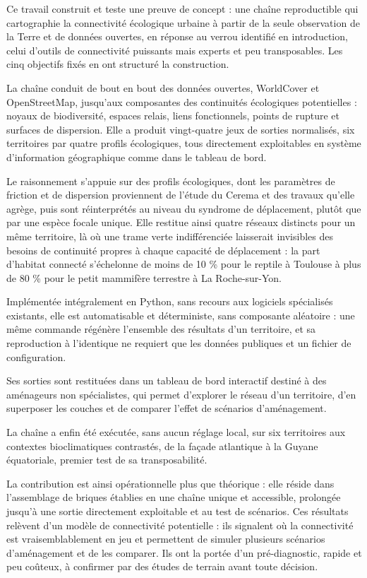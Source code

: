 \documentclass[a4paper,11pt]{report}
\begin{document}
Ce travail construit et teste une preuve de concept : une chaîne reproductible qui cartographie la connectivité écologique urbaine à partir de la seule observation de la Terre et de données ouvertes, en réponse au verrou identifié en introduction, celui d'outils de connectivité puissants mais experts et peu transposables. Les cinq objectifs fixés en ont structuré la construction.

La chaîne conduit de bout en bout des données ouvertes, WorldCover et OpenStreetMap, jusqu'aux composantes des continuités écologiques potentielles : noyaux de biodiversité, espaces relais, liens fonctionnels, points de rupture et surfaces de dispersion. Elle a produit vingt-quatre jeux de sorties normalisés, six territoires par quatre profils écologiques, tous directement exploitables en système d'information géographique comme dans le tableau de bord.

Le raisonnement s'appuie sur des profils écologiques, dont les paramètres de friction et de dispersion proviennent de l'étude du Cerema et des travaux qu'elle agrège, puis sont réinterprétés au niveau du syndrome de déplacement, plutôt que par une espèce focale unique. Elle restitue ainsi quatre réseaux distincts pour un même territoire, là où une trame verte indifférenciée laisserait invisibles des besoins de continuité propres à chaque capacité de déplacement : la part d'habitat connecté s'échelonne de moins de 10 \% pour le reptile à Toulouse à plus de 80 \% pour le petit mammifère terrestre à La Roche-sur-Yon.

Implémentée intégralement en Python, sans recours aux logiciels spécialisés existants, elle est automatisable et déterministe, sans composante aléatoire : une même commande régénère l'ensemble des résultats d'un territoire, et sa reproduction à l'identique ne requiert que les données publiques et un fichier de configuration.

Ses sorties sont restituées dans un tableau de bord interactif destiné à des aménageurs non spécialistes, qui permet d'explorer le réseau d'un territoire, d'en superposer les couches et de comparer l'effet de scénarios d'aménagement.

La chaîne a enfin été exécutée, sans aucun réglage local, sur six territoires aux contextes bioclimatiques contrastés, de la façade atlantique à la Guyane équatoriale, premier test de sa transposabilité.

La contribution est ainsi opérationnelle plus que théorique : elle réside dans l'assemblage de briques établies en une chaîne unique et accessible, prolongée jusqu'à une sortie directement exploitable et au test de scénarios. Ces résultats relèvent d'un modèle de connectivité potentielle : ils signalent où la connectivité est vraisemblablement en jeu et permettent de simuler plusieurs scénarios d'aménagement et de les comparer. Ils ont la portée d'un pré-diagnostic, rapide et peu coûteux, à confirmer par des études de terrain avant toute décision.
\end{document}
